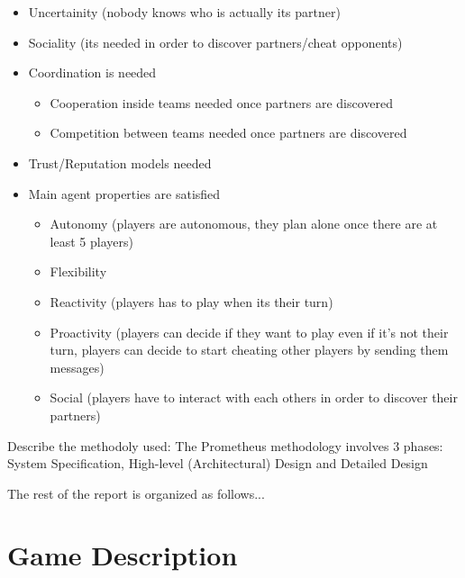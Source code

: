 \documentclass[a4paper]{article}
\begin{document}
\begin{itemize}
  \item Uncertainity (nobody knows who is actually its partner)
  \item Sociality (its needed in order to discover partners/cheat opponents)
  \item Coordination is needed
  \begin{itemize}
    \item Cooperation inside teams needed once partners are discovered
    \item Competition between teams needed once partners are discovered
  \end{itemize}
  \item Trust/Reputation models needed 
  \item Main agent properties are satisfied
  \begin{itemize}
    \item Autonomy (players are autonomous, they plan alone once there are at least 5 players)
    \item Flexibility
    \item Reactivity (players has to play when its their turn)
    \item Proactivity (players can decide if they want to play even if it's not their turn, players can decide to start cheating other players by sending them messages)
    \item Social (players have to interact with each others in order to discover their partners)
  \end{itemize}
\end{itemize}

Describe the methodoly used:
 The Prometheus methodology involves 3 phases: System Specification, High-level (Architectural) Design and Detailed Design

The rest of the report is organized as follows...

\section{Game Description}
\end{document}
